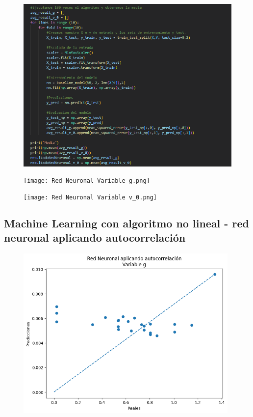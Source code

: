 \documentclass[oneside,openright,titlepage,numbers=noenddot,openany,headinclude,footinclude=true,
cleardoublepage=empty,abstractoff,BCOR=5mm,paper=a4,fontsize=12pt,main=spanish]{scrreprt}
\begin{document}
\begin{figure}[H]
	\centering
	\includegraphics[width=15cm]{Código Red Neuronal.png}
\end{figure}

\begin{figure}[H]
	\centering
	\texttt{[image: Red Neuronal Variable g.png]}
\end{figure}

\begin{figure}[H]
	\centering
	\texttt{[image: Red Neuronal Variable v\_0.png]}
\end{figure}

\subsection{Machine Learning con algoritmo no lineal - red neuronal aplicando autocorrelación}

\begin{figure}[H]
	\centering
	\includegraphics[width=11cm]{Red Neuronal aplicando autocorrelación Variable g.png}
\end{figure}
\end{document}
